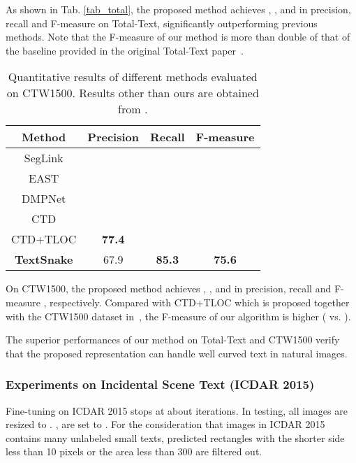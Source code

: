 \documentclass[runningheads]{llncs}
\begin{document}
As shown in Tab. \ref{tab_total}, the proposed method achieves , , and  in precision, recall and F-measure on Total-Text, significantly outperforming previous methods. Note that the F-measure of our method is more than double of that of the baseline provided in the original Total-Text paper~\cite{kheng2017total}.
\begin{table}
\small
\vspace{-2mm}
\begin{centering}
\caption{Quantitative results of different methods evaluated on CTW1500. Results other than ours are obtained from \cite{Yuliang2017Detecting}.} \label{tab_CTW1500}
\begin{tabular}{|c|c|c|c|}
\hline 
\textbf{Method} & \textbf{Precision} & \textbf{Recall} & \textbf{F-measure} \tabularnewline
\hline 
\hline 
SegLink \cite{Shi_2017_CVPR} &   &  &  \tabularnewline
\hline 
EAST \cite{Zhou_2017_CVPR} &   &  &  \tabularnewline
\hline 
DMPNet \cite{Liu2017Deep} &   &  &  \tabularnewline
\hline 
CTD\cite{Yuliang2017Detecting} &  &  &  \tabularnewline
\hline 
CTD+TLOC\cite{Yuliang2017Detecting} & \textbf{77.4} &  &  \tabularnewline
\hline
\textbf{TextSnake} & 67.9 & \textbf{85.3} & \textbf{75.6} \tabularnewline
\hline 
\end{tabular}
\par\end{centering}
\vspace{-4mm}
\end{table}

On CTW1500, the proposed method achieves , , and  in precision, recall and F-measure
, respectively. Compared with CTD+TLOC which is proposed together with the CTW1500 dataset in~\cite{Yuliang2017Detecting}, the F-measure of our algorithm is  higher ( vs. ).

The superior performances of our method on Total-Text and CTW1500 verify that the proposed representation can handle well curved text in natural images.


\subsubsection*{Experiments on Incidental Scene Text (ICDAR 2015)}

Fine-tuning on ICDAR 2015 stops at about  iterations.
In testing, all images are resized to . ,  are set to .  For the consideration that images in ICDAR 2015 contains many unlabeled small texts,  predicted rectangles with the shorter side less than 10 pixels or the area less than 300 are filtered out. 
\end{document}
